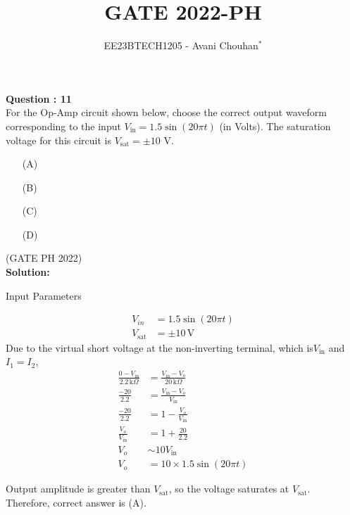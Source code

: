 \documentclass[journal,12pt,twocolumn]{IEEEtran}
\begin{document}

\vspace{3cm}

\title{GATE 2022-PH}
\author{EE23BTECH1205 - Avani Chouhan$^{*}$}
\maketitle
\bigskip

\renewcommand{\thefigure}{\theenumi}
\renewcommand{\thetable}{\theenumi}

\vspace{3cm}
\textbf{Question : 11} \\
For the Op-Amp circuit shown below, choose the correct output waveform corresponding to the input \( V_{\text{in}} = 1.5 \sin(20 \pi t) \) (in Volts). The saturation voltage for this circuit is \( V_{\text{sat}} = \pm 10 \) V.
\begin{figure}[ht]
\centering
    
\end{figure}
\begin{enumerate}
  \item[(A)]
  \begin{figure}[ht!]
    \centering
    
\end{figure}
  \item[(B)]  
  \begin{figure}[ht]
    \centering
    
\end{figure}
  \item[(C)] 
  \begin{figure}[ht]
    \centering
    
\end{figure}
  \item[(D)] 
   \begin{figure}[ht]
    \centering
    
\end{figure}
\end{enumerate}

\hfill{(GATE PH 2022)}\\
\textbf{Solution:} \\
\fi
\begin{table}[htbp]
  \centering
  
  \caption{Input Parameters}
\end{table}
\begin{align}
V_{in} &= 1.5 \sin(20\pi t)\\
V_{\text{sat}} &= \pm 10 \, \text{V}
\end{align}
Due to the virtual short voltage at the non-inverting terminal, which is\( V_{\text{in}} \) and $I_1 = I_2$,\\
\begin{align}
\frac{0 - V_{\text{in}}}{2.2 \, \text{k}\Omega} &= \frac{V_{\text{in}} - V_o}{20 \, \text{k}\Omega}\\
\frac{-20}{2.2} &= \frac{V_{\text{in}} - V_o}{V_{\text{in}}}\\
\frac{-20}{2.2} &= 1 - \frac{V_o}{V_{\text{in}}}\\
\frac{V_o}{V_{\text{in}}} &= 1 + \frac{20}{2.2}\\
V_o &\sim 10 V_{\text{in}}\\
V_o &= 10 \times 1.5 \sin(20\pi t)
\end{align}

Output amplitude is greater than $V_{\text{sat}}$, so the voltage saturates at $V_{\text{sat}}$.\\
Therefore, correct answer is (A).
\end{document}

